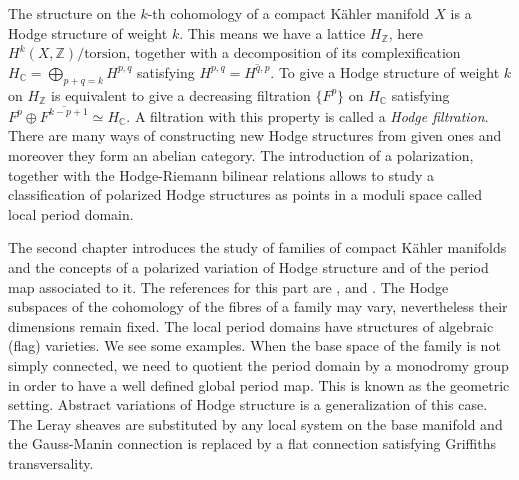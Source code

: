 \documentclass{article}
\newcommand{\CC}{\mathbb{C}}
\newcommand{\ZZ}{\mathbb{Z}}
\numberwithin{equation}{section}
\begin{document}
The structure on the $k$-th cohomology of a compact K\"{a}hler manifold $X$ is a Hodge structure of weight $k$. This means we have a lattice $H_\ZZ$, here $H^k(X,\ZZ) / \textrm{torsion}$, together with a decomposition of its complexification $H_\CC = \bigoplus_{p+q=k} H^{p,q}$ satisfying $H^{p,q} = \overline{H^{q,p}}$. To give a Hodge structure of weight $k$ on $H_\ZZ$ is equivalent to give a decreasing filtration $\{ F^p \}$ on $H_\CC$ satisfying $F^p \oplus \overline{F^{k-p+1}} \simeq H_\CC$. A filtration with this property is called a \emph{Hodge filtration}.
There are many ways of constructing new Hodge structures from given ones and moreover they form an abelian category. The introduction of a polarization, together with the Hodge-Riemann bilinear relations allows to study a classification of polarized Hodge structures as points in a moduli space called local period domain.

%
%

The second chapter introduces the study of families of compact K\"{a}hler manifolds and the concepts of a polarized variation of Hodge structure and of the period map associated to it. The references for this part are \cite{FRT15}, \cite{CMSP03} and \cite{Voi07}. The Hodge subspaces of the cohomology of the fibres of a family may vary, nevertheless their dimensions remain fixed. The local period domains have structures of algebraic (flag) varieties. We see some examples. When the base space of the family is not simply connected, we need to quotient the period domain by a monodromy group in order to have a well defined global period map.
This is known as the geometric setting. Abstract variations of Hodge structure is a generalization of this case. The Leray sheaves are substituted by any local system on the base manifold and the Gauss-Manin connection is replaced by a flat connection satisfying Griffiths transversality.


%
%
\end{document}
